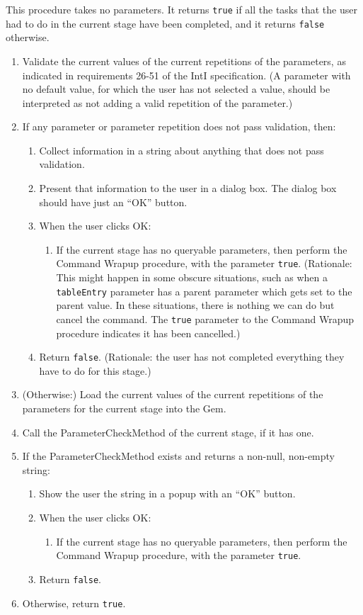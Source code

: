 \documentclass[11pt]{article}
\begin{document}
This procedure takes no parameters.  It returns {\tt true} if all the tasks
that the user had to do in the current stage have been completed, and
it returns {\tt false} otherwise.
\begin{enumerate}
\item Validate the current values of the current repetitions of the
  parameters, as indicated in requirements 26-51 of the IntI
  specification.  (A parameter with no default value, for which the user
  has not selected a value, should be interpreted as not adding a valid
  repetition of the parameter.)
\item If any parameter or parameter repetition does not pass validation,
  then:
  \begin{enumerate}
  \item Collect information in a string about anything that does
    not pass validation.
  \item Present that information to the user in a dialog box.
    The dialog box should have just an ``OK'' button.
  \item When the user clicks OK:
    \begin{enumerate}
    \item If the current stage has no queryable
      parameters, then perform the Command Wrapup procedure, with the
      parameter {\tt true}.  (Rationale:  This might happen in some obscure
      situations, such as when a {\tt tableEntry} parameter has a parent
      parameter which gets set to the parent value.  In
      these situations, there is nothing we can do but cancel the command.
      The {\tt true} parameter to the Command Wrapup procedure indicates it has
      been cancelled.)
    \end{enumerate}
  \item Return {\tt false}.  (Rationale:  the
    user has not completed everything they have to do for this stage.)
  \end{enumerate}
\item (Otherwise:) Load the current values of the current repetitions of
  the parameters for the current stage into the Gem.
\item Call the ParameterCheckMethod of the current stage, if it has one.
\item If the ParameterCheckMethod exists and returns a non-null, non-empty
  string:
  \begin{enumerate}
  \item Show the user the string in a popup with an ``OK'' button.
  \item When the user clicks OK:
    \begin{enumerate}
    \item If the current stage has no queryable
      parameters, then perform the Command Wrapup procedure, with the
      parameter {\tt true}.
    \end{enumerate}
  \item Return {\tt false}.
  \end{enumerate}
\item Otherwise, return {\tt true}.
\end{enumerate}
\end{document}
